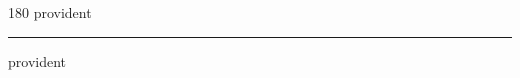 
\begin{frame}
\begin{center}
\begin{turn}{180}
{\fontsize{2.5cm}{1em}\selectfont provident}
\end{turn}
\vspace{1em}\par  
\hrule
\vspace{1em}\par  
{\fontsize{2.5cm}{1em}\selectfont provident}
\end{center}
\end{frame}
